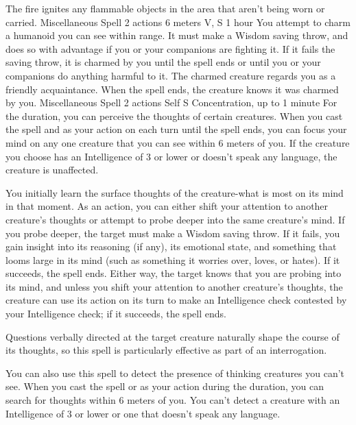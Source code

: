     The fire ignites any flammable objects in the area that aren't being worn or carried.
    {Miscellaneous Spell}
    {2 actions}
    {6 meters}
    {V, S}
    {1 hour}
    You attempt to charm a humanoid you can see within range.
    It must make a Wisdom saving throw, and does so with advantage if you or your companions are fighting it.
    If it fails the saving throw, it is charmed by you until the spell ends or until you or your companions do anything harmful to it.
    The charmed creature regards you as a friendly acquaintance.
    When the spell ends, the creature knows it was charmed by you.
    {Miscellaneous Spell}
    {2 actions}
    {Self}
    {S}
    {Concentration, up to 1 minute}
    For the duration, you can perceive the thoughts of certain creatures.
    When you cast the spell and as your action on each turn until the spell ends, you can focus your mind on any one creature that you can see within 6 meters of you.
    If the creature you choose has an Intelligence of 3 or lower or doesn't speak any language, the creature is unaffected.

    You initially learn the surface thoughts of the creature-what is most on its mind in that moment.
    As an action, you can either shift your attention to another creature's thoughts or attempt to probe deeper into the same creature's mind.
    If you probe deeper, the target must make a Wisdom saving throw.
    If it fails, you gain insight into its reasoning (if any), its emotional state, and something that looms large in its mind (such as something it worries over, loves, or hates).
    If it succeeds, the spell ends.
    Either way, the target knows that you are probing into its mind, and unless you shift your attention to another creature's thoughts, the creature can use its action on its turn to make an Intelligence check contested by your Intelligence check; if it succeeds, the spell ends.

    Questions verbally directed at the target creature naturally shape the course of its thoughts, so this spell is particularly effective as part of an interrogation.

    You can also use this spell to detect the presence of thinking creatures you can't see.
    When you cast the spell or as your action during the duration, you can search for thoughts within 6 meters of you.
    You can't detect a creature with an Intelligence of 3 or lower or one that doesn't speak any language.

